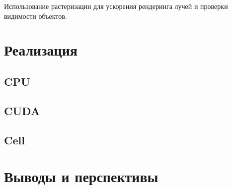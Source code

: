 \documentclass[a4paper,12pt,oneside]{article}
\begin{document}
Использование растеризации для ускорения рендеринга лучей и проверки видимости объектов.

\section{Реализация}
\label{c:impl}

\subsection{CPU}

\subsection{CUDA}

\subsection{Cell}

\section{Выводы и перспективы}
\end{document}
